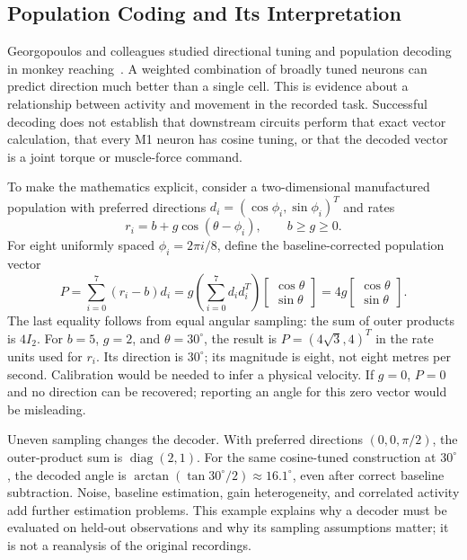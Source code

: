 \subsection{Population Coding and Its Interpretation}

Georgopoulos and colleagues studied directional tuning and population decoding
in monkey reaching~\cite{Georgopoulos1982,Georgopoulos1986}. A weighted combination
of broadly tuned neurons can predict direction much better than a single cell.
This is evidence about a relationship between activity and movement in the
recorded task. Successful decoding does not establish that downstream circuits
perform that exact vector calculation, that every M1 neuron has cosine tuning,
or that the decoded vector is a joint torque or muscle-force command.

To make the mathematics explicit, consider a two-dimensional manufactured
population with preferred directions
$d_i=(\cos\phi_i,\sin\phi_i)^T$ and rates
\begin{equation}
 r_i=b+g\cos(\theta-\phi_i),\qquad b\ge g\ge0.
\end{equation}
For eight uniformly spaced $\phi_i=2\pi i/8$, define the baseline-corrected
population vector
\begin{equation}
 P=\sum_{i=0}^7(r_i-b)d_i
   =g\left(\sum_{i=0}^7 d_id_i^T\right)
        \begin{bmatrix}\cos\theta\\\sin\theta\end{bmatrix}
   =4g\begin{bmatrix}\cos\theta\\\sin\theta\end{bmatrix}.
 \label{eq:ch3:population-vector}
\end{equation}
The last equality follows from equal angular sampling: the sum of outer
products is $4I_2$. For $b=5$, $g=2$, and $\theta=30^\circ$, the result is
$P=(4\sqrt3,4)^T$ in the rate units used for $r_i$. Its direction is
$30^\circ$; its magnitude is eight, not eight metres per second. Calibration
would be needed to infer a physical velocity. If $g=0$, $P=0$ and no direction
can be recovered; reporting an angle for this zero vector would be misleading.

Uneven sampling changes the decoder. With preferred directions
$(0,0,\pi/2)$, the outer-product sum is $\operatorname{diag}(2,1)$.
For the same cosine-tuned construction at $30^\circ$, the decoded angle is
$\arctan(\tan30^\circ/2)\approx16.1^\circ$, even after correct baseline
subtraction. Noise, baseline estimation, gain heterogeneity, and correlated
activity add further estimation problems. This example explains why a decoder
must be evaluated on held-out observations and why its sampling assumptions
matter; it is not a reanalysis of the original recordings.

